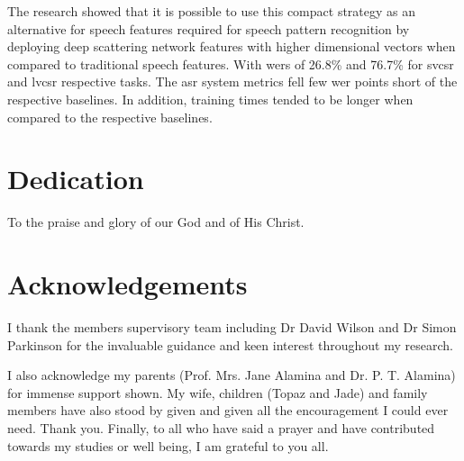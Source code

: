\documentclass[12pt,twoside]{report}
\begin{document}
The research showed that it is possible to use this compact strategy as an alternative for speech features required for speech pattern recognition by deploying deep scattering network features with higher dimensional vectors when compared to traditional speech features. With \acrlong{wer}s of 26.8\% and 76.7\% for \acrshort{svcsr} and \acrshort{lvcsr} respective tasks. The \acrshort{asr} system metrics fell few \acrshort{wer} points short of the respective baselines.  In addition, training times tended to be longer when compared to the respective baselines.
\stopblue
{}


\chapter*{Dedication}
To the praise and glory of our God and of His Christ.

\chapter*{Acknowledgements}
I thank the members supervisory team including Dr David Wilson and Dr Simon Parkinson for the invaluable guidance and keen interest throughout my research.  

I also acknowledge my parents (Prof. Mrs. Jane Alamina and Dr. P. T. Alamina) for immense support shown.  My wife, children (Topaz and Jade) and family members have also stood by given and given all the encouragement I could ever need.  Thank you.  Finally, to all who have said a prayer and have contributed towards my studies or well being, I am grateful to you all.

\end{document}
